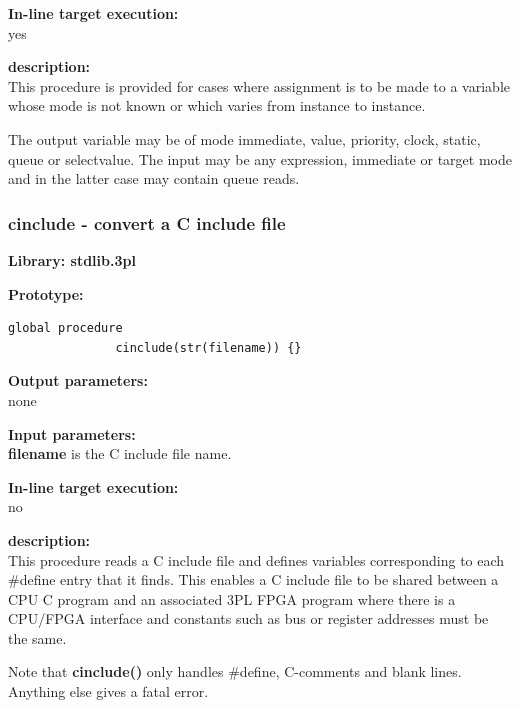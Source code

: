             {\bf In-line target execution:} \\
            yes

            {\bf description:} \\
            This procedure is provided for cases where assignment is to be
            made to a variable whose mode is not known or which varies from
            instance to instance.
            
            The output variable may be of mode immediate, value, priority,
            clock, static, queue or selectvalue. The input may be any expression,
            immediate or target mode and in the latter case may contain queue
            reads.





        \subsubsection{cinclude - convert a C include file}\label{sec:lpcinclude}

            {\bf Library: stdlib.3pl}

            {\bf Prototype:} \\
            \vsp
            \begin{lstlisting}[gobble=12, language=threepl]
               global procedure
               cinclude(str(filename)) {}
            \end{lstlisting}

            {\bf Output parameters:} \\
            none

            {\bf Input parameters:} \\            
            {\bf filename} is the C include file name.
        
            {\bf In-line target execution:} \\
            no

            {\bf description:} \\
            This procedure reads a C include file and defines variables
            corresponding to each \#define entry that it finds. This enables
            a C include file to be shared between a CPU C program and
            an associated 3PL FPGA program where there is a CPU/FPGA interface
            and constants such as bus or register addresses must be the same.

            Note that {\bf cinclude()} only handles \#define, C-comments and
            blank lines. Anything else gives a fatal error.
            
